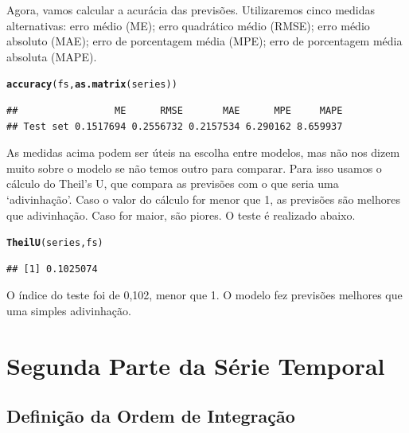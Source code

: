 \documentclass{article}\usepackage[]{graphicx}\usepackage[]{color}
\makeatletter
\newcommand{\hlstd}[1]{\textcolor[rgb]{0.345,0.345,0.345}{#1}}%
\newcommand{\hlkwd}[1]{\textcolor[rgb]{0.737,0.353,0.396}{\textbf{#1}}}%
\newenvironment{kframe}{%
 \def\at@end@of@kframe{}%
 \ifinner\ifhmode%
  \def\at@end@of@kframe{\end{minipage}}%
  \begin{minipage}{\columnwidth}%
 \fi\fi%
 \def\FrameCommand##1{\hskip\@totalleftmargin \hskip-\fboxsep
 \colorbox{shadecolor}{##1}\hskip-\fboxsep
     \hskip-\linewidth \hskip-\@totalleftmargin \hskip\columnwidth}%
 \MakeFramed {\advance\hsize-\width
   \@totalleftmargin\z@ \linewidth\hsize
   \@setminipage}}%
 {\par\unskip\endMakeFramed%
 \at@end@of@kframe}
\newenvironment{knitrout}{}{} %
\makeatother
\begin{document}
            Agora, vamos calcular a acurácia das previsões. Utilizaremos cinco medidas alternativas: erro médio (ME); erro quadrático médio (RMSE); erro médio absoluto (MAE); erro de porcentagem média (MPE); erro de porcentagem média absoluta (MAPE).
        
\begin{knitrout}
\color{fgcolor}\begin{kframe}
\begin{alltt}
\hlkwd{accuracy}\hlstd{(fs,}\hlkwd{as.matrix}\hlstd{(series))}
\end{alltt}
\begin{verbatim}
##                 ME      RMSE       MAE      MPE     MAPE
## Test set 0.1517694 0.2556732 0.2157534 6.290162 8.659937
\end{verbatim}
\end{kframe}
\end{knitrout}

          As medidas acima podem ser úteis na escolha entre modelos, mas não nos dizem muito sobre o modelo se não temos outro para comparar. Para isso usamos o cálculo do Theil's U, que compara as previsões com o que seria uma `adivinhação'. Caso o valor do cálculo for menor que 1, as previsões são melhores que adivinhação. Caso for maior, são piores. O teste é realizado abaixo.
            
\begin{knitrout}
\color{fgcolor}\begin{kframe}
\begin{alltt}
\hlkwd{TheilU}\hlstd{(series,fs)}
\end{alltt}
\begin{verbatim}
## [1] 0.1025074
\end{verbatim}
\end{kframe}
\end{knitrout}
        
          O índice do teste foi de 0,102, menor que 1. O modelo fez previsões melhores que uma simples adivinhação.
        



\section{Segunda Parte da Série Temporal}

    \subsection{Definição da Ordem de Integração}
    
\end{document}
